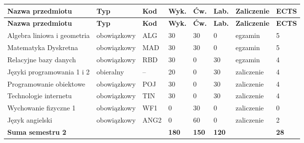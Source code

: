 \documentclass[12pt,a4paper]{article}
\newcommand{\thdrule}{\noalign{\global\setlength{\extrarowheight}{0pt}}}
\newcommand{\thdend}{\noalign{\global\setlength{\extrarowheight}{4pt}}}
\begin{document}
{\scriptsize
\begin{longtable}{m{5.0cm}m{1.9cm}m{0.75cm}m{0.85cm}m{0.85cm}m{0.85cm}m{1.45cm}m{0.9cm}}
\thdrule\toprule
\rowcolor{pjatkRed}
{\color{white}\footnotesize\textbf{\vphantom{Ag}Nazwa przedmiotu}} & {\color{white}\footnotesize\textbf{\vphantom{Ag}Typ}} & {\color{white}\footnotesize\textbf{\vphantom{Ag}Kod}} & {\color{white}\footnotesize\textbf{\vphantom{Ag}Wyk.}} & {\color{white}\footnotesize\textbf{\vphantom{Ag}Ćw.}} & {\color{white}\footnotesize\textbf{\vphantom{Ag}Lab.}} & {\color{white}\footnotesize\textbf{\vphantom{Ag}Zaliczenie}} & {\color{white}\footnotesize\textbf{\vphantom{Ag}ECTS}} \\
\midrule\thdend
\endfirsthead
\thdrule\toprule
\rowcolor{pjatkRed}
{\color{white}\footnotesize\textbf{\vphantom{Ag}Nazwa przedmiotu}} & {\color{white}\footnotesize\textbf{\vphantom{Ag}Typ}} & {\color{white}\footnotesize\textbf{\vphantom{Ag}Kod}} & {\color{white}\footnotesize\textbf{\vphantom{Ag}Wyk.}} & {\color{white}\footnotesize\textbf{\vphantom{Ag}Ćw.}} & {\color{white}\footnotesize\textbf{\vphantom{Ag}Lab.}} & {\color{white}\footnotesize\textbf{\vphantom{Ag}Zaliczenie}} & {\color{white}\footnotesize\textbf{\vphantom{Ag}ECTS}} \\
\midrule\thdend
\endhead
\rowcolor{tableRowLight} Algebra liniowa i geometria & {\scriptsize obowiązkowy} & ALG & 30 & 30 & 0 & {\scriptsize egzamin} & 5 \\
\rowcolor{tableRowAlt} Matematyka Dyskretna & {\scriptsize obowiązkowy} & MAD & 30 & 30 & 0 & {\scriptsize egzamin} & 5 \\
\rowcolor{tableRowLight} Relacyjne bazy danych & {\scriptsize obowiązkowy} & RBD & 30 & 0 & 30 & {\scriptsize egzamin} & 4 \\
\rowcolor{tableElective} Języki programowania 1 i 2 & {\scriptsize obieralny} & -- & 20 & 0 & 30 & {\scriptsize zaliczenie} & 4 \\
\rowcolor{tableRowAlt} Programowanie obiektowe & {\scriptsize obowiązkowy} & POJ & 30 & 0 & 30 & {\scriptsize zaliczenie} & 4 \\
\rowcolor{tableRowLight} Technologie internetu & {\scriptsize obowiązkowy} & TIN & 30 & 0 & 30 & {\scriptsize zaliczenie} & 4 \\
\rowcolor{tableRowAlt} Wychowanie fizyczne 1 & {\scriptsize obowiązkowy} & WF1 & 0 & 30 & 0 & {\scriptsize zaliczenie} & 0 \\
\rowcolor{tableRowLight} Język angielski & {\scriptsize obowiązkowy} & ANG2 & 0 & 60 & 0 & {\scriptsize zaliczenie} & 2 \\
\midrule[\heavyrulewidth]
\rowcolor{tableSummary} \textbf{Suma semestru 2} & & & \textbf{180} & \textbf{150} & \textbf{120} & & \textbf{28} \\
\bottomrule
\end{longtable}}
\end{document}
